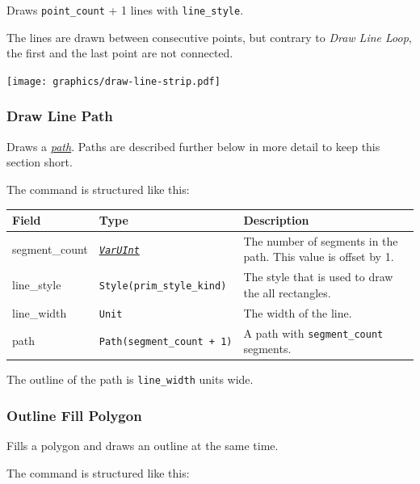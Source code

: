 \documentclass[]{article}
\newcommand{\link}[2]{\hyperlink{#1}{\emph{#2}}}
\begin{document}
Draws \texttt{point\_count} + 1 lines with \texttt{line\_style}. 

The lines are drawn between consecutive points, but contrary to \emph{Draw Line Loop}, the first and the last point are not connected.

\begin{center}
\texttt{[image: graphics/draw-line-strip.pdf]}
\end{center}

\hypertarget{draw-line-path}{\subsubsection{Draw Line Path}\label{draw-line-path}}

Draws a \link{path}{path}. Paths are described further
below in more detail to keep this section short.

The command is structured like this:

\begin{longtable}[]{@{}p{1in}p{2in}p{3in}@{}}
\toprule
Field & Type & Description \\
\midrule
\endhead
segment\_count & \link{varuint}{\texttt{VarUInt}}    & The number of segments in the path. This value is offset by 1. \\
line\_style    & \texttt{Style(prim\_style\_kind)}   & The style that is used to draw the all rectangles. \\
line\_width    & \texttt{Unit}                       & The width of the line. \\
path           & \texttt{Path(segment\_count\ +\ 1)} & A path with \texttt{segment\_count} segments. \\
\bottomrule
\end{longtable}

The outline of the path is \texttt{line\_width} units wide.

\hypertarget{outline-fill-polygon}{\subsubsection{Outline Fill Polygon}\label{outline-fill-polygon}}

Fills a polygon and draws an outline at the same time.

The command is structured like this:
\end{document}
